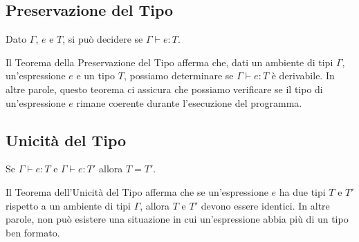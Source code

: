 \subsection{Preservazione del Tipo}
\begin{tcolorbox}
  Dato $\Gamma$, $e$ e $T$, si può decidere se $\Gamma \vdash e : T$.
\end{tcolorbox}
Il Teorema della Preservazione del Tipo afferma che, dati un ambiente di tipi $\Gamma$, un'espressione $e$ e un tipo $T$,
possiamo determinare se $\Gamma \vdash e : T$ è derivabile. In altre parole, questo teorema ci assicura che possiamo verificare
se il tipo di un'espressione $e$ rimane coerente durante l'esecuzione del programma.

\subsection{Unicità del Tipo}
\begin{tcolorbox}
  Se $\Gamma \vdash e: T $ e $\Gamma \vdash e : T'$ allora $T = T'$.
\end{tcolorbox}
Il Teorema dell'Unicità del Tipo afferma che se un'espressione $e$ ha due tipi $T$ e $T'$ rispetto a un ambiente di tipi $\Gamma$,
allora $T$ e $T'$ devono essere identici. In altre parole, non può esistere una situazione in cui un'espressione abbia più di un
tipo ben formato.